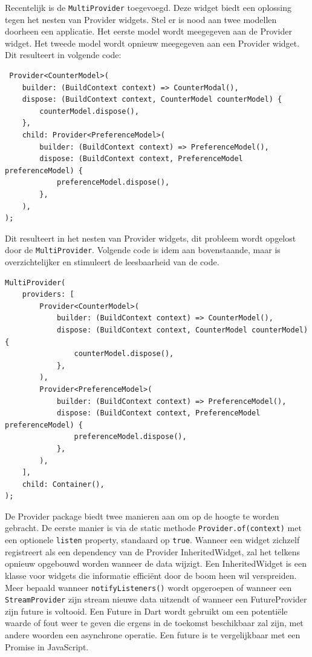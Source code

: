 Recentelijk is de \verb|MultiProvider| toegevoegd. Deze widget biedt een oplossing tegen het nesten van Provider widgets. Stel er is nood aan twee modellen doorheen een applicatie. Het eerste model wordt meegegeven aan de Provider widget. Het tweede model wordt opnieuw meegegeven aan een Provider widget. Dit resulteert in volgende code:
 \begin{verbatim}
 Provider<CounterModel>(
    builder: (BuildContext context) => CounterModal(),
    dispose: (BuildContext context, CounterModel counterModel) {
        counterModel.dispose(),
    },
    child: Provider<PreferenceModel>(
        builder: (BuildContext context) => PreferenceModel(),
        dispose: (BuildContext context, PreferenceModel preferenceModel) {
            preferenceModel.dispose(),
        },
    ),
);
\end{verbatim}
Dit resulteert in het nesten van Provider widgets, dit probleem wordt opgelost door de \verb|MultiProvider|. Volgende code is idem aan bovenstaande, maar is overzichtelijker en stimuleert de leesbaarheid van de code.
 \begin{verbatim}
MultiProvider(
    providers: [
        Provider<CounterModel>(
            builder: (BuildContext context) => CounterModel(),
            dispose: (BuildContext context, CounterModel counterModel) {
                counterModel.dispose(),
            },
        ),
        Provider<PreferenceModel>(
            builder: (BuildContext context) => PreferenceModel(),
            dispose: (BuildContext context, PreferenceModel preferenceModel) {
                preferenceModel.dispose(),
            },
        ),
    ],
    child: Container(),
);

\end{verbatim}

De Provider package biedt twee manieren aan om op de hoogte te worden gebracht.
De eerste manier is via de static methode \verb|Provider.of(context)| met een optionele \verb|listen| property, standaard op \verb|true|.
Wanneer een widget zichzelf registreert als een dependency van de Provider InheritedWidget, zal het telkens opnieuw opgebouwd worden wanneer de data wijzigt. Een InheritedWidget is een klasse voor widgets die informatie efficiënt door de boom heen wil verspreiden.
 Meer bepaald wanneer \verb|notifyListeners()| wordt opgeroepen of wanneer een \verb|StreamProvider| zijn stream nieuwe data uitzendt of wanneer een FutureProvider zijn future is voltooid. Een Future in Dart wordt gebruikt om een potentiële waarde of fout weer te geven die ergens in de toekomst beschikbaar zal zijn, met andere woorden een asynchrone operatie. Een future is te vergelijkbaar met een Promise in JavaScript.

